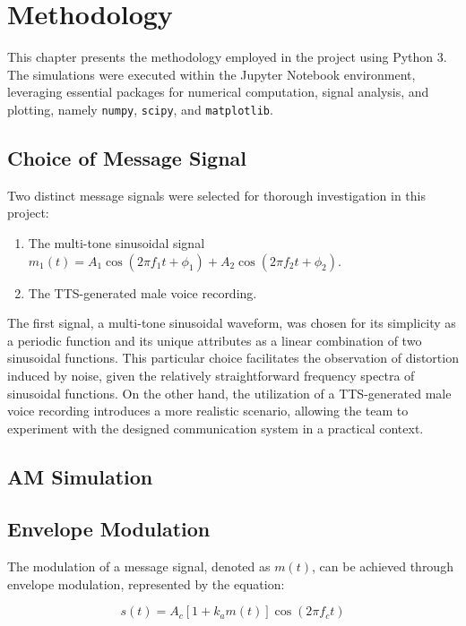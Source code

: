 \documentclass[../ECE459FinalProjectReport.tex]{subfiles}
\begin{document}
\chapter{Methodology}
This chapter presents the methodology employed in the project using Python 3. The simulations were executed within the Jupyter Notebook environment, leveraging essential packages for numerical computation, signal analysis, and plotting, namely \verb|numpy|, \verb|scipy|, and \verb|matplotlib|.

\section{Choice of Message Signal}

Two distinct message signals were selected for thorough investigation in this project:
\begin{enumerate}
    \item The multi-tone sinusoidal signal $m_1 (t) = A_1\cos(2\pi f_1 t + \phi_1) + A_2 \cos(2\pi f_2 t + \phi_2)$.
    \item The TTS-generated male voice recording.
\end{enumerate}

The first signal, a multi-tone sinusoidal waveform, was chosen for its simplicity as a periodic function and its unique attributes as a linear combination of two sinusoidal functions. This particular choice facilitates the observation of distortion induced by noise, given the relatively straightforward frequency spectra of sinusoidal functions. On the other hand, the utilization of a TTS-generated male voice recording introduces a more realistic scenario, allowing the team to experiment with the designed communication system in a practical context.

\section{AM Simulation}
\section{Envelope Modulation}

The modulation of a message signal, denoted as $m(t)$, can be achieved through envelope modulation, represented by the equation:

\begin{equation}
    s(t) = A_c [1 + k_a m(t)] \cos (2\pi f_c t)
\end{equation}
\end{document}
